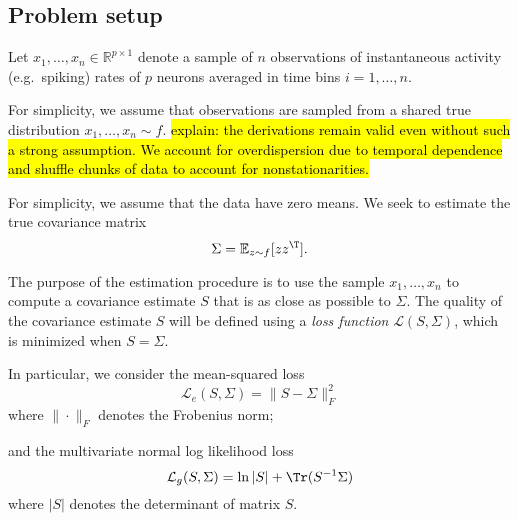\subsection*{Problem setup}
Let $x_1,\ldots,x_n \in \mathbb R^{p\times 1}$ denote a sample of $n$ observations of instantaneous activity (e.g.~spiking) rates of $p$ neurons averaged in time bins $i=1,\ldots,n$.  

For simplicity, we assume that observations are sampled from a shared true distribution $x_1,\ldots,x_n \sim f$. 
\hl{\tiny explain: the derivations remain valid even without such a strong assumption.  We account for overdispersion due to temporal dependence and shuffle chunks of data to account for nonstationarities.} 

For simplicity, we assume that the data have zero means. 
We seek to estimate the true covariance matrix 
\begin{equation}
\Sigma=\mathbb E_{z\sim f}[ zz^\T].
\end{equation}

The purpose of the estimation procedure is to use the sample $x_1,\ldots,x_n$ to compute a covariance estimate $S$ that is as close as possible to $\Sigma$. 
The quality of the covariance estimate $S$ will be defined using a \emph{loss function} $\mathcal L\left(S, \Sigma\right)$, which is minimized when $S=\Sigma$. 

In particular, we consider the mean-squared loss
\begin{equation}
\mathcal L_e( S, \Sigma) =  \| S - \Sigma\|^2_F 
\end{equation}
where $\| \cdot \|_F$ denotes the Frobenius norm;

and the multivariate normal log likelihood loss
\begin{equation}
\mathcal L_g(S,\Sigma) = \ln |S| +  \Tr(S^{-1} \Sigma)
\end{equation}
where $|S|$ denotes the determinant of matrix $S$. 


